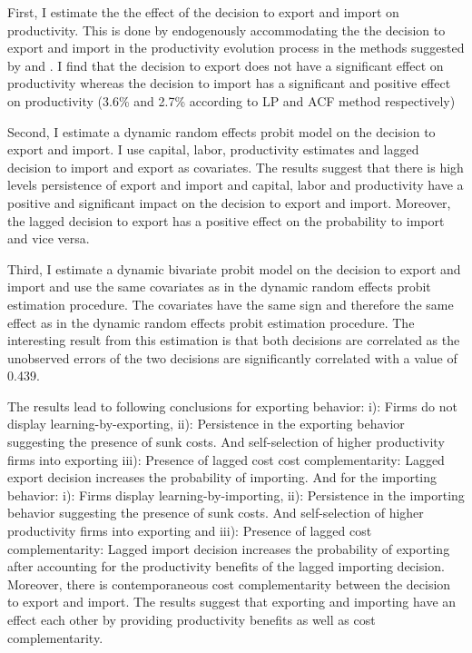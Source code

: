 \documentclass[12pt]{article}
\begin{document}
First, I estimate the the effect of the decision to export and import
on productivity. This is done by endogenously accommodating the the
decision to export and import in the productivity evolution process in
the methods suggested by \textcite{levinsohn2003estimating} and
\textcite{ackerberg2006structural}. I find that the decision to export
does not have a significant effect on productivity whereas the
decision to import has a significant and positive effect  on
productivity (3.6\% and 2.7\% according to LP and ACF method respectively) 

Second, I estimate a dynamic random effects probit model on the
decision to export and import. I use  capital, labor,  productivity
estimates and lagged decision to import and
export as covariates. The results suggest that there is high levels persistence of export and import
and capital, labor and  productivity have a positive and significant
impact on the decision to export and import. Moreover, the lagged
decision to export has a positive effect on the probability to import
and vice versa. 

Third, I estimate a dynamic bivariate probit model  on the
decision to export and import and use the same covariates as in the
dynamic random effects probit estimation procedure. The covariates
have the same sign and therefore the same effect as in the dynamic
random effects probit estimation procedure.
The interesting result from this estimation is that both decisions are
correlated as the unobserved errors of the two decisions are
significantly correlated with a value of 0.439.  



The results lead to following conclusions for exporting behavior:
i): Firms do not display learning-by-exporting,
ii): Persistence in the exporting behavior suggesting the presence of
sunk costs.  And 
  self-selection of higher productivity firms into
   exporting  
iii):  Presence of lagged cost cost complementarity: Lagged export
decision increases the probability of importing.
And for the importing behavior:
i): Firms  display learning-by-importing,
ii): Persistence in the importing behavior suggesting the presence of
sunk costs. And self-selection of higher productivity firms into
   exporting and
iii):  Presence of lagged cost complementarity: Lagged import decision
increases the probability of exporting after accounting for the
productivity benefits of the lagged importing decision. 
Moreover, there is contemporaneous cost complementarity between the
decision to export and import. The results suggest that exporting and
importing have an effect each other by providing productivity benefits
as well as cost complementarity. 
\end{document}
